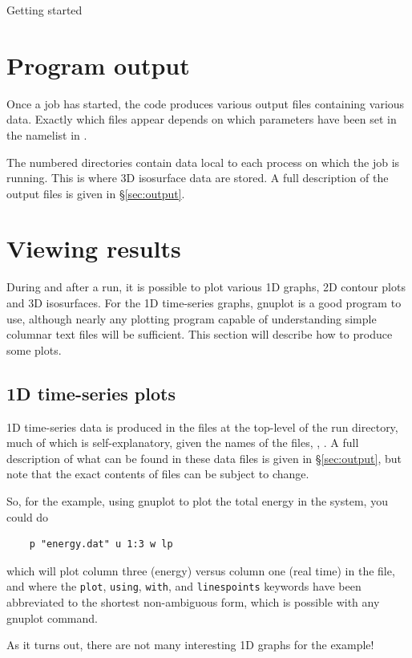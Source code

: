 \begin{chapter}{\label{cha:quickstart}Getting started}
  \section{Program output}
  Once a job has started, the code produces various output files containing
  various data.  Exactly which files appear depends on which parameters have
  been set in the  namelist in .

  The numbered  directories contain data local to each process on
  which the job is running.  This is where 3D isosurface data are stored.  A
  full description of the output files is given in \S\ref{sec:output}.

  \section{\label{sec:viewing_results}Viewing results}
  During and after a run, it is possible to plot various 1D graphs, 2D contour
  plots and 3D isosurfaces.  For the 1D time-series graphs, gnuplot is a good
  program to use, although nearly any plotting program capable of understanding
  simple columnar text files will be sufficient.  This section will describe
  how to produce some plots.
  
  \subsection{1D time-series plots}
  1D time-series data is produced in the  files at the top-level
  of the run directory, much of which is self-explanatory, given the names of
  the files, \eg {}, .  A full description
  of what can be found in these data files is given in \S\ref{sec:output}, but
  note that the exact contents of files can be subject to change.
  
  So, for the  example, using gnuplot to plot the total energy
  in the system, you could do
  \begin{Verbatim}
    p "energy.dat" u 1:3 w lp
  \end{Verbatim}
  which will plot column three (energy) versus column one (real time) in the
  file, and where the \verb"plot", \verb"using", \verb"with", and
  \verb"linespoints" keywords have been abbreviated to the shortest
  non-ambiguous form, which is possible with any gnuplot command.

  As it turns out, there are not many interesting 1D graphs for the
   example!


\end{chapter}
